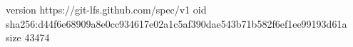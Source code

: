 version https://git-lfs.github.com/spec/v1
oid sha256:d44f6e68909a8e0cc934617e02a1c5af390dae543b71b582f6ef1ee99193d61a
size 43474
